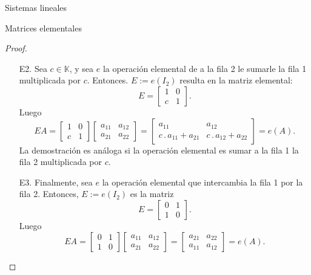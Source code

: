 \documentclass[a4paper,12pt,twoside,spanish]{amsbook}
\theoremstyle{definition}
\theoremstyle{remark}
\newcommand{\K}{\mathbb K}
\begin{document}
\begin{chapter}{Sistemas lineales}
\begin{section}{Matrices elementales}
\begin{proof}
\begin{enumerate}
					\item[E2.] Sea  $c \in \K$, y  sea $e$ la operación elemental de a la fila 2 le sumarle  la fila 1 multiplicada por $c$. Entonces. $E:=e(I_2)$ resulta en la matriz elemental: 
					\begin{equation*}
					E=\begin{bmatrix} 1& 0\\ c&1\end{bmatrix}.
					\end{equation*}
					Luego 
					\begin{equation*}
					EA= \begin{bmatrix} 1& 0\\ c&1\end{bmatrix}	\begin{bmatrix} a_{11}&a_{12}\\a_{21}&a_{22}\end{bmatrix} = 
					\begin{bmatrix} 
					a_{11} &a_{12}\\
					c\,.\,a_{11} + a_{21}&c\,.\,a_{12}+a_{22}\end{bmatrix} = e(A).
					\end{equation*}
					La demostración es análoga si la operación elemental es sumar a la fila 1 la fila 2 multiplicada por $c$.
					
					\item[E3.]  Finalmente, sea $e$ la operación elemental que intercambia la fila 1 por la fila 2. Entonces,  $E:=e(I_2)$ es la matriz 
					\begin{equation*}
					E=\begin{bmatrix} 0& 1\\ 1&0\end{bmatrix}.
					\end{equation*}
					Luego
					\begin{equation*}
					EA= \begin{bmatrix} 0& 1\\ 1&0\end{bmatrix}	\begin{bmatrix} a_{11}&a_{12}\\a_{21}&a_{22}\end{bmatrix} = 
					\begin{bmatrix}
					a_{21} &a_{22}\\
					a_{11} &a_{12}\end{bmatrix} = e(A).
					\end{equation*}
				\end{enumerate}
				

\end{proof}
\end{section}
\end{chapter}
\end{document}
